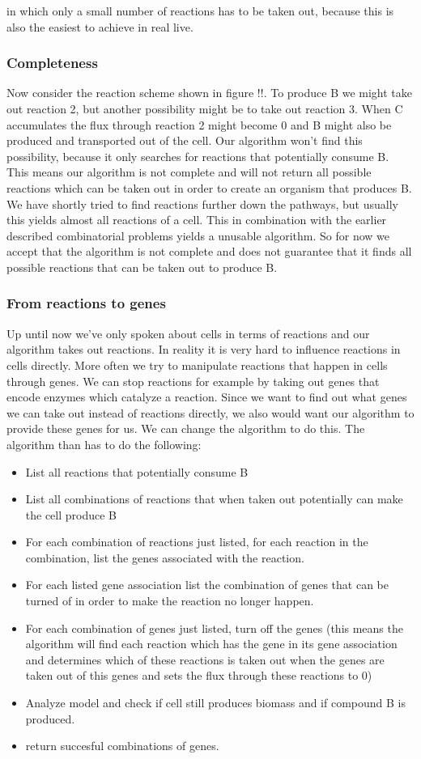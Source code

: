 \documentclass[10pt]{report}
\begin{document}
in which only a small number of reactions has to be taken out, because this is also the easiest to achieve in real live.

\subsubsection{Completeness}
Now consider the reaction scheme shown in figure !!. To produce B we might take out reaction 2, but another possibility might be to take out reaction 3. When C accumulates the flux through reaction 2 might become 0 and B might also be produced and transported out of the cell. Our algorithm won't find this possibility, because it only searches for reactions that potentially consume B. This means our algorithm is not complete and will not return all possible reactions which can be taken out in order to create an organism that produces B. We have shortly tried to find reactions further down the pathways, but usually this yields almost all reactions of a cell. This in combination with the earlier described combinatorial problems yields a unusable algorithm. So for now we accept that the algorithm is not complete and does not guarantee that it finds all possible reactions that can be taken out to produce B.

\subsubsection{From reactions to genes}
Up until now we've only spoken about cells in terms of reactions and our algorithm takes out reactions. In reality it is very hard to influence reactions in cells directly. More often we try to manipulate reactions that happen in cells through genes. We can stop reactions for example by taking out genes that encode enzymes which catalyze a reaction. Since we want to find out what genes we can take out instead of reactions directly, we also would want our algorithm to provide these genes for us. We can change the algorithm to do this.
The algorithm than has to do the following:
\begin{itemize}
\item List all reactions that potentially consume B
\item List all combinations of reactions that when taken out potentially can make the cell produce B
\item For each combination of reactions just listed, for each reaction in the combination, list the genes associated with the reaction.
\item For each listed gene association list the combination of genes that can be turned of in order to make the reaction no longer happen.
\item For each combination of genes just listed, turn off the genes (this means the algorithm will find each reaction which has the gene in its gene association and determines which of these reactions is taken out when the genes are taken out of this genes and sets the flux through these reactions to 0)
\item Analyze model and check if cell still produces biomass and if compound B is produced.
\item return succesful combinations of genes.
\end{itemize}
\end{document}
